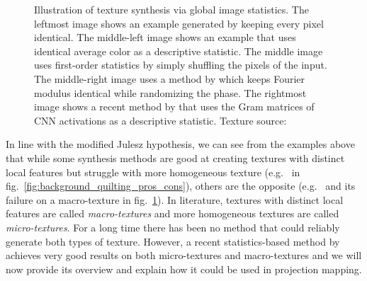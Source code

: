 \begin{figure}[ht]
    \centering
    \caption{Illustration of texture synthesis via global image statistics. The leftmost image shows an example generated by keeping every pixel identical. The middle-left image shows an example that uses identical average color as a descriptive statistic. The middle image uses first-order statistics by simply shuffling the pixels of the input. The middle-right image uses a method by \citet{Galerne2011} which keeps Fourier modulus identical while randomizing the phase. The rightmost image shows a recent method by \citet{Gatys2015} that uses the Gram matrices of CNN activations as a descriptive statistic. Texture source: \citet{Gatys2015}}
    \label{fig:background_statistics_example}
\end{figure}

In line with the modified Julesz hypothesis, we can see from the examples above that while some synthesis methods are good at creating textures with distinct local features but struggle with more homogeneous texture (e.g.~\citet{Efros2001} in fig.~\ref{fig:background_quilting_pros_cons}), others are the opposite (e.g.~\citet{Galerne2011} and its failure on a macro-texture in fig.~\ref{fig:background_statistics_example}). In literature, textures with distinct local features are called \textit{macro-textures} and more homogeneous textures are called \textit{micro-textures}. For a long time there has been no method that could reliably generate both types of texture. However, a recent statistics-based method by \citet{Gatys2015} achieves very good results on both micro-textures and macro-textures and we will now provide its overview and explain how it could be used in projection mapping.

